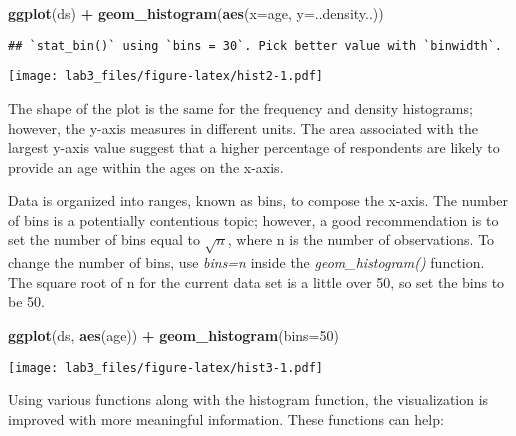 \documentclass[]{article}
\newenvironment{Shaded}{\begin{snugshade}}{\end{snugshade}}
\newcommand{\KeywordTok}[1]{\textcolor[rgb]{0.13,0.29,0.53}{\textbf{#1}}}
\newcommand{\DataTypeTok}[1]{\textcolor[rgb]{0.13,0.29,0.53}{#1}}
\newcommand{\DecValTok}[1]{\textcolor[rgb]{0.00,0.00,0.81}{#1}}
\newcommand{\StringTok}[1]{\textcolor[rgb]{0.31,0.60,0.02}{#1}}
\newcommand{\OperatorTok}[1]{\textcolor[rgb]{0.81,0.36,0.00}{\textbf{#1}}}
\newcommand{\NormalTok}[1]{#1}
\begin{document}
\begin{Shaded}
\begin{Highlighting}[]
\KeywordTok{ggplot}\NormalTok{(ds) }\OperatorTok{+}
\StringTok{  }\KeywordTok{geom_histogram}\NormalTok{(}\KeywordTok{aes}\NormalTok{(}\DataTypeTok{x=}\NormalTok{age, }\DataTypeTok{y=}\NormalTok{..density..))}
\end{Highlighting}
\end{Shaded}

\begin{verbatim}
## `stat_bin()` using `bins = 30`. Pick better value with `binwidth`.
\end{verbatim}

\texttt{[image: lab3\_files/figure-latex/hist2-1.pdf]}

The shape of the plot is the same for the frequency and density
histograms; however, the y-axis measures in different units. The area
associated with the largest y-axis value suggest that a higher
percentage of respondents are likely to provide an age within the ages
on the x-axis.

Data is organized into ranges, known as bins, to compose the x-axis. The
number of bins is a potentially contentious topic; however, a good
recommendation is to set the number of bins equal to \(\sqrt n\), where
n is the number of observations. To change the number of bins, use
\emph{bins=n} inside the \emph{geom\_histogram()} function. The square
root of n for the current data set is a little over 50, so set the bins
to be 50.

\begin{Shaded}
\begin{Highlighting}[]
\KeywordTok{ggplot}\NormalTok{(ds, }\KeywordTok{aes}\NormalTok{(age)) }\OperatorTok{+}
\StringTok{  }\KeywordTok{geom_histogram}\NormalTok{(}\DataTypeTok{bins=}\DecValTok{50}\NormalTok{)}
\end{Highlighting}
\end{Shaded}

\texttt{[image: lab3\_files/figure-latex/hist3-1.pdf]}

Using various functions along with the histogram function, the
visualization is improved with more meaningful information. These
functions can help:
\end{document}
